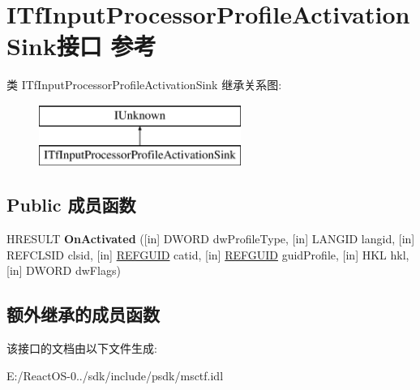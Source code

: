 \hypertarget{interface_i_tf_input_processor_profile_activation_sink}{}\section{I\+Tf\+Input\+Processor\+Profile\+Activation\+Sink接口 参考}
\label{interface_i_tf_input_processor_profile_activation_sink}
类 I\+Tf\+Input\+Processor\+Profile\+Activation\+Sink 继承关系图\+:\begin{figure}[H]
\begin{center}
\leavevmode
\includegraphics[height=2.000000cm]{interface_i_tf_input_processor_profile_activation_sink}
\end{center}
\end{figure}
\subsection*{Public 成员函数}
\begin{DoxyCompactItemize}
\item 
\mbox{\label{interface_i_tf_input_processor_profile_activation_sink_a96bf426a9ffc6ee980844a817c04cbdf}} 
H\+R\+E\+S\+U\+LT {\bfseries On\+Activated} (\mbox{[}in\mbox{]} D\+W\+O\+RD dw\+Profile\+Type, \mbox{[}in\mbox{]} L\+A\+N\+G\+ID langid, \mbox{[}in\mbox{]} R\+E\+F\+C\+L\+S\+ID clsid, \mbox{[}in\mbox{]} \hyperlink{struct___g_u_i_d}{R\+E\+F\+G\+U\+ID} catid, \mbox{[}in\mbox{]} \hyperlink{struct___g_u_i_d}{R\+E\+F\+G\+U\+ID} guid\+Profile, \mbox{[}in\mbox{]} H\+KL hkl, \mbox{[}in\mbox{]} D\+W\+O\+RD dw\+Flags)
\end{DoxyCompactItemize}
\subsection*{额外继承的成员函数}


该接口的文档由以下文件生成\+:\begin{DoxyCompactItemize}
\item 
E\+:/\+React\+O\+S-\/0../sdk/include/psdk/msctf.\+idl\end{DoxyCompactItemize}
